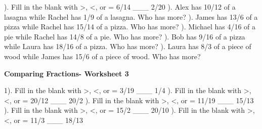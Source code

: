 \documentclass{article}%
\begin{document}
\newline%
). Fill in the blank with >, <, or = 6/14 \_\_\_ 2/20%
\newline%
\newline%
). Alex has 10/12 of a lasagna while Rachel has 1/9 of a lasagna. Who has more?%
\newline%
\newline%
). James has 13/6 of a pizza while Rachel has 15/14 of a pizza. Who has more?%
\newline%
\newline%
). Michael has 4/16 of a pie while Rachel has 14/8 of a pie. Who has more?%
\newline%
\newline%
). Bob has 9/16 of a pizza while Laura has 18/16 of a pizza. Who has more?%
\newline%
\newline%
). Laura has 8/3 of a piece of wood while James has 15/6 of a piece of wood. Who has more?%
\newline%
\newline%
\newline%
\pagebreak%
\large%
\begin{center}%
\textbf{Comparing Fractions- Worksheet 3}%
\newline%
\end{center} \normalsize%
1). Fill in the blank with >, <, or = 3/19 \_\_\_ 1/4%
\newline%
\newline%
). Fill in the blank with >, <, or = 20/12 \_\_\_ 20/2%
\newline%
\newline%
). Fill in the blank with >, <, or = 11/19 \_\_\_ 15/13%
\newline%
\newline%
). Fill in the blank with >, <, or = 15/2 \_\_\_ 20/10%
\newline%
\newline%
). Fill in the blank with >, <, or = 11/3 \_\_\_ 18/13%
\newline%
\end{document}
